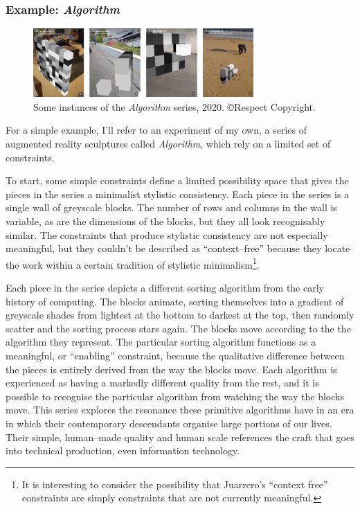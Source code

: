 \documentclass[letterpaper]{article}
\begin{document}
    \subsubsection{Example: \emph{Algorithm}}

    \begin{figure}[h]
    \includegraphics[width=3.31in]{bubble-sort.png}
    \caption{Some instances of the \emph{Algorithm} series, 2020. \copyright Respect Copyright.}
    \end{figure}

    For a simple example, I'll refer to an experiment of my own, a series of augmented reality sculptures called \emph{Algorithm}, which rely on a limited set of constraints.
    
    To start, some simple constraints define a limited possibility space that gives the pieces in the series a minimalist stylistic consistency. Each piece in the series is a single wall of greyscale blocks. The number of rows and columns in the wall is variable, as are the dimensions of the blocks, but they all look recognisably similar. The constraints that produce stylistic consistency are not especially meaningful, but they couldn't be described as “context–free” because they locate the work within a certain tradition of stylistic minimalism\footnote{
        It is interesting to consider the possibility that Juarrero's “context free” constraints are simply constraints that are not currently meaningful.
    }.
    
    Each piece in the series depicts a different sorting algorithm from the early history of computing. The blocks animate, sorting themselves into a gradient of greyscale shades from lightest at the bottom to darkest at the top, then randomly scatter and the sorting process stars again. The blocks move according to the the algorithm they represent. The particular sorting algorithm functions as a meaningful, or “enabling” constraint, because the qualitative difference between the pieces is entirely derived from the way the blocks move. Each algorithm is experienced as having a markedly different quality from the rest, and it is possible to recognise the particular algorithm from watching the way the blocks move. This series explores the resonance these primitive algorithms have in an era in which their contemporary descendants organise large portions of our lives. Their simple, human–made quality and human scale references the craft that goes into technical production, even information technology.
\end{document}
